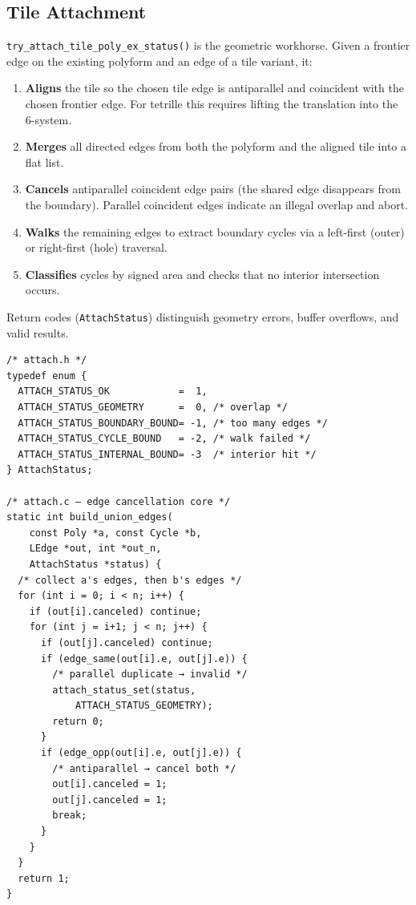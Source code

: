 \documentclass[10pt,a4paper]{article}
\newcommand{\code}[1]{\texttt{\small #1}}
\newcommand{\file}[1]{\texttt{\footnotesize #1}}
\begin{document}
\subsection{Tile Attachment}

\begin{tcolorbox}[dualbox, title=Attachment Algorithm — \file{src/core/attach.c}]
  \code{try\_attach\_tile\_poly\_ex\_status()} is the geometric
  workhorse.  Given a frontier edge on the existing polyform and an
  edge of a tile variant, it:

  \begin{enumerate}
    \item \textbf{Aligns} the tile so the chosen tile edge is
      antiparallel and coincident with the chosen frontier edge.  For
      tetrille this requires lifting the translation into the 6-system.
    \item \textbf{Merges} all directed edges from both the polyform and
      the aligned tile into a flat list.
    \item \textbf{Cancels} antiparallel coincident edge pairs
      (the shared edge disappears from the boundary).  Parallel
      coincident edges indicate an illegal overlap and abort.
    \item \textbf{Walks} the remaining edges to extract boundary cycles
      via a left-first (outer) or right-first (hole) traversal.
    \item \textbf{Classifies} cycles by signed area and checks that no
      interior intersection occurs.
  \end{enumerate}

  Return codes (\code{AttachStatus}) distinguish geometry errors,
  buffer overflows, and valid results.
\tcblower
\begin{verbatim}
/* attach.h */
typedef enum {
  ATTACH_STATUS_OK            =  1,
  ATTACH_STATUS_GEOMETRY      =  0, /* overlap */
  ATTACH_STATUS_BOUNDARY_BOUND= -1, /* too many edges */
  ATTACH_STATUS_CYCLE_BOUND   = -2, /* walk failed */
  ATTACH_STATUS_INTERNAL_BOUND= -3  /* interior hit */
} AttachStatus;

/* attach.c — edge cancellation core */
static int build_union_edges(
    const Poly *a, const Cycle *b,
    LEdge *out, int *out_n,
    AttachStatus *status) {
  /* collect a's edges, then b's edges */
  for (int i = 0; i < n; i++) {
    if (out[i].canceled) continue;
    for (int j = i+1; j < n; j++) {
      if (out[j].canceled) continue;
      if (edge_same(out[i].e, out[j].e)) {
        /* parallel duplicate → invalid */
        attach_status_set(status,
            ATTACH_STATUS_GEOMETRY);
        return 0;
      }
      if (edge_opp(out[i].e, out[j].e)) {
        /* antiparallel → cancel both */
        out[i].canceled = 1;
        out[j].canceled = 1;
        break;
      }
    }
  }
  return 1;
}
\end{verbatim}
\end{tcolorbox}
\end{document}
